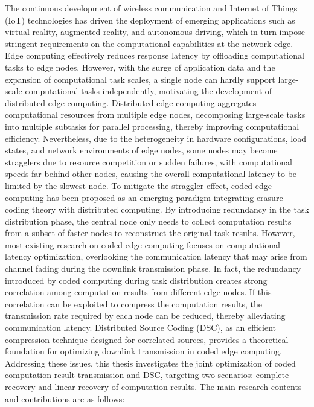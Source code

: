 
The continuous development of wireless communication and Internet of Things (IoT) technologies has driven the deployment of emerging applications such as virtual reality, augmented reality, and autonomous driving, which in turn impose stringent requirements on the computational capabilities at the network edge. Edge computing effectively reduces response latency by offloading computational tasks to edge nodes. However, with the surge of application data and the expansion of computational task scales, a single node can hardly support large-scale computational tasks independently, motivating the development of distributed edge computing. Distributed edge computing aggregates computational resources from multiple edge nodes, decomposing large-scale tasks into multiple subtasks for parallel processing, thereby improving computational efficiency. Nevertheless, due to the heterogeneity in hardware configurations, load states, and network environments of edge nodes, some nodes may become stragglers due to resource competition or sudden failures, with computational speeds far behind other nodes, causing the overall computational latency to be limited by the slowest node. To mitigate the straggler effect, coded edge computing has been proposed as an emerging paradigm integrating erasure coding theory with distributed computing. By introducing redundancy in the task distribution phase, the central node only needs to collect computation results from a subset of faster nodes to reconstruct the original task results. However, most existing research on coded edge computing focuses on computational latency optimization, overlooking the communication latency that may arise from channel fading during the downlink transmission phase. In fact, the redundancy introduced by coded computing during task distribution creates strong correlation among computation results from different edge nodes. If this correlation can be exploited to compress the computation results, the transmission rate required by each node can be reduced, thereby alleviating communication latency. Distributed Source Coding (DSC), as an efficient compression technique designed for correlated sources, provides a theoretical foundation for optimizing downlink transmission in coded edge computing. Addressing these issues, this thesis investigates the joint optimization of coded computation result transmission and DSC, targeting two scenarios: complete recovery and linear recovery of computation results. The main research contents and contributions are as follows:

